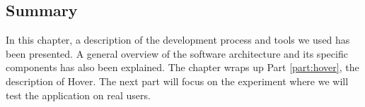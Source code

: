 \subsection{Summary}
In this chapter, a description of the development process and tools we used has been presented. A general overview of the software architecture and its specific components has also been explained. The chapter wraps up Part \ref{part:hover}, the description of Hover. The next part will focus on the experiment where we will test the application on real users.